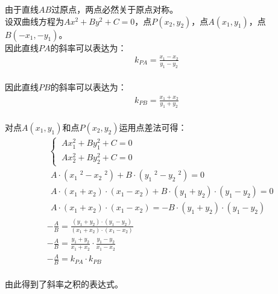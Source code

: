 \documentclass[UTF8]{ctexart}
\begin{document}
\newpage

    由于直线$AB$过原点，两点必然关于原点对称。\\[3mm]
    设双曲线方程为$Ax^2+By^2+C=0$，点$P(x_2,y_2)$，点$A(x_1,y_1)$，点$B(-x_1,-y_1)$。\\[3mm]
    因此直线$PA$的斜率可以表达为：
    \begin{align}
        k_{PA}=\frac{x_1-x_2}{y_1-y_2}
    \end{align}\\
    因此直线$PB$的斜率可以表达为：
    \begin{align}
        k_{PB}=\frac{x_1+x_2}{y_1+y_2}
    \end{align}\\
    对点$A(x_1,y_1)$和点$P(x_2,y_2)$运用点差法可得：\vspace{5pt}
    \begin{align}
        &~\begin{cases}
            ~Ax_1^2+By_1^2+C=0\\[1mm]
            ~Ax_2^2+By_2^2+C=0
        \end{cases}\\[8mm]
        &~~A\cdot\left(x_1\;^2-x_2\;^2\right)+B\cdot\left(y_1\;^2-y_2\;^2\right)=0\\[8mm]
        &~~A\cdot(x_1+x_2)\cdot(x_1-x_2)+B\cdot(y_1+y_2)\cdot(y_1-y_2)=0\\[8mm]
        &~~A\cdot(x_1+x_2)\cdot(x_1-x_2)=-B\cdot(y_1+y_2)\cdot(y_1-y_2)\\[8mm]
        &-\frac{A}{B}=\frac{(y_1+y_2)\cdot(y_1-y_2)}{(x_1+x_2)\cdot(x_1-x_2)}\\[8mm]
        &-\frac{A}{B}=\frac{y_1+y_2}{x_1+x_2}\cdot\frac{y_1-y_2}{x_1-x_2}\\[8mm]
        &-\frac{A}{B}=k_{PA}\cdot k_{PB}
    \end{align}\\
    由此得到了斜率之积的表达式。

\newpage
\end{document}
